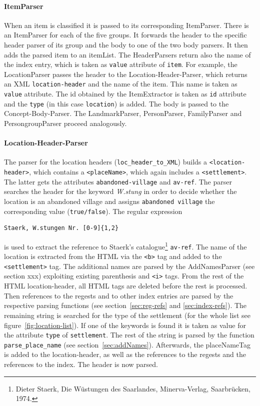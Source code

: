 \paragraph{ItemParser}
When an item is classified it is passed to its corresponding ItemParser. There is an ItemParser for each of the five groups. It forwards the header to the specific header parser of its group and the body to one of the two body parsers. It then adds the parsed item to an itemList. The HeaderParsers return also the name of the index entry, which is taken as \texttt{value} attribute of \texttt{item}. For example, the LocationParser passes the header to the Location-Header-Parser, which returns an XML \texttt{location-header} and the name of the item. This name is taken as \texttt{value} attribute. The id obtained by the ItemExtractor is taken as \texttt{id} attribute and the \texttt{type} (in this case \texttt{location}) is added. The body is passed to the Concept-Body-Parser. The LandmarkParser, PersonParser, FamilyParser and PersongroupParser proceed analogously. 

\paragraph{Location-Header-Parser}
The parser for the location headers (\texttt{loc\_header\_to\_XML}) builds a \texttt{<location-header>}, which contains a \texttt{<placeName>}, which again includes a \texttt{<settlement>}. The latter gets the attributes \texttt{abandoned-village} and \texttt{av-ref}. The parser searches the header for the keyword \textit{W.stung} in order to decide whether the location is an abandoned village and assigns \texttt{abandoned village} the corresponding value (\texttt{true/false}). The regular expression 

\begin{verbatim}
Staerk, W.stungen Nr. [0-9]{1,2} 
\end{verbatim}

is used to extract the reference to Staerk's catalogue\footnote{Dieter Staerk, Die Wüstungen des Saarlandes, Minerva-Verlag, Saarbrücken, 1974.} \texttt{av-ref}. The name of the location is extracted from the HTML via the \texttt{<b>} tag and added to the \texttt{<settlement>} tag. The additional names are parsed by the AddNamesParser (see section xxx) exploiting existing parenthesis and \texttt{<i>} tags. From the rest of the HTML location-header, all HTML tags are deleted before the rest is processed. Then references to the regests and to other index entries are parsed by the respective parsing functions (see section~\ref{sec:reg-refs} and \ref{sec:index-refs}). The remaining string is searched for the type of the settlement (for the whole list see figure~\ref{fig:location-list}). If one of the keywords is found it is taken as value for the attribute \texttt{type} of \texttt{settlement}. The rest of the string is parsed by the function \texttt{parse\_place\_name} (see section~\ref{sec:addNames}). Afterwards, the placeNameTag is added to the location-header, as well as the references to the regests and the references to the index. The header is now parsed.

